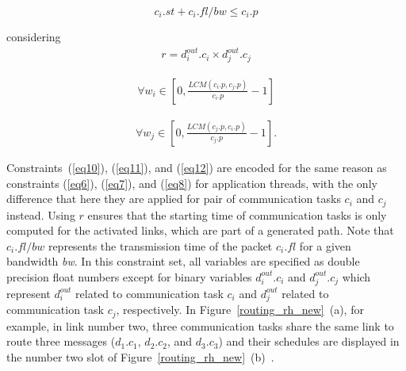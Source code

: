 \begin{equation}
	{c_i}.{st} + {c_i}.{fl}/bw \leq {c_i}.{p}
	\label{eq12}
\end{equation}

considering
\begin{equation*}
	\begin{split}
	{r} = d_i^{out}.c_i \times d_j^{out}.c_j   
	\label{}
		\end{split}
\end{equation*} 

\begin{equation*}
	\begin{split}
	\forall{w_i} \in \left[ 0, \frac{LCM ({c_i}.{p}, {c_j}.{p})}{{c_i}.{p}} - 1 \right]   
	\label{}
	\end{split}
\end{equation*}

\begin{equation*}
	\begin{split}
	\forall{w_j} \in \left[ 0, \frac{LCM ({c_j}.{p}, {c_i}.{p})}{{c_j}.{p}} - 1 \right].
	\label{}
		\end{split}
\end{equation*}\newline


    Constraints~(\ref{eq10}), (\ref{eq11}), and (\ref{eq12}) are encoded for the same reason as constraints (\ref{eq6}), (\ref{eq7}), and (\ref{eq8}) for application threads, with the only difference that here they are applied for pair of communication tasks $c_i$ and $c_j$ instead. Using $r$ ensures that the starting time of communication tasks is only computed for the activated links, which are part of a generated path.  %
    Note that $ {c_i}.{fl}/bw $ represents the transmission
    time of the packet $ {c_i}.{fl} $ for a given bandwidth \textit{bw}. In this constraint set, all variables are specified as double precision float numbers except for binary variables $d_i^{out}.c_i$ and $d_j^{out}.c_j$ which represent $d_i^{out}$ related to communication task $c_i$ and $d_j^{out}$ related to communication task $c_j$, respectively. In Figure~\ref{routing_rh_new}~(a), for example, in link number two, three communication tasks share the same link to route three messages ($d_1.c_1$, $d_2.c_2$, and $d_3.c_3$) and their schedules are displayed in the number two slot of Figure~\ref{routing_rh_new}~(b)~\cite{askaripoor2023designer}. 
    
